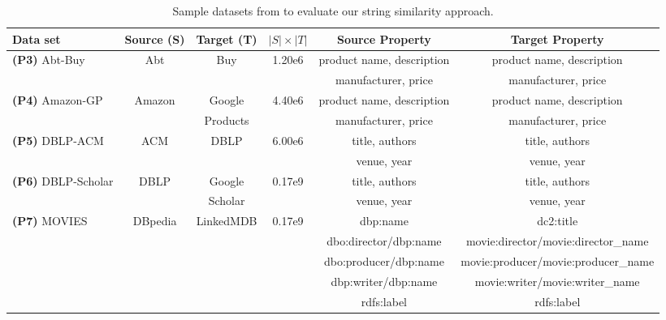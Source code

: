 \documentclass[sw]{iosart2x}
\begin{document}
\begin{table}[htb]
\centering
\caption{Sample datasets from \cite{georgala2018dynamic} to evaluate our string similarity approach.}
\label{tab:TableFmeasure}
\resizebox{1.0\textwidth}{!}
{
\begin{tabular}{lccS[table-format=1.2e1]cc}
    \toprule
    \textbf{Data set}           & \textbf{Source (S)} & \textbf{Target (T)} & \textbf{$|S| \times |T|$} & \textbf{Source Property} & \textbf{Target Property}                           \\ \midrule
    
    \textbf{(P3)} Abt-Buy    & Abt & Buy  & 1.20e6 & product name, description                       & product name, description                         \\
                                &&&& manufacturer, price               & manufacturer, price                       \\ \midrule
    \textbf{(P4)} Amazon-GP  & Amazon & Google & 4.40e6 & product name, description                 & product name, description                         \\ 
                                && Products && manufacturer, price               & manufacturer, price                       \\ \midrule
    \textbf{(P5)} DBLP-ACM  & ACM & DBLP& 6.00e6 & title, authors                    & title, authors                            \\
                                &&&& venue, year                       & venue, year                               \\ \midrule
    \textbf{(P6)} DBLP-Scholar& DBLP & Google  & 0.17e9 & title, authors                    & title, authors                            \\
                                && Scholar && venue, year                       & venue, year                               \\ \midrule
    \textbf{(P7)} MOVIES   & DBpedia & LinkedMDB & 0.17e9 & dbp:name                          & dc2:title     \\
                                &&&& dbo:director/dbp:name             & movie:director/movie:director\_name       \\
                                &&&& dbo:producer/dbp:name             & movie:producer/movie:producer\_name       \\
                                &&&& dbp:writer/dbp:name            & movie:writer/movie:writer\_name           \\
                                &&&& rdfs:label & rdfs:label           \\ 
    \bottomrule
\end{tabular}
}
\end{table}
\end{document}
